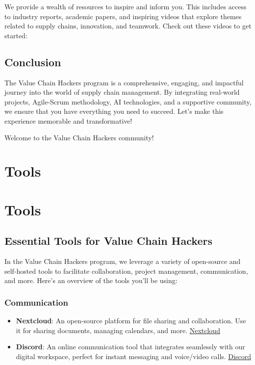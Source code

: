 \documentclass[
  letterpaper,
  DIV=11,
  numbers=noendperiod]{scrreprt}
\begin{document}
We provide a wealth of resources to inspire and inform you. This
includes access to industry reports, academic papers, and inspiring
videos that explore themes related to supply chains, innovation, and
teamwork. Check out these videos to get started:

\section{Conclusion}\label{conclusion-2}

The Value Chain Hackers program is a comprehensive, engaging, and
impactful journey into the world of supply chain management. By
integrating real-world projects, Agile-Scrum methodology, AI
technologies, and a supportive community, we ensure that you have
everything you need to succeed. Let's make this experience memorable and
transformative!

Welcome to the Value Chain Hackers community! 🚀🌟


\chapter{Tools}\label{tools}


\chapter{Tools}\label{tools-1}

\section{Essential Tools for Value Chain
Hackers}\label{essential-tools-for-value-chain-hackers}

In the Value Chain Hackers program, we leverage a variety of open-source
and self-hosted tools to facilitate collaboration, project management,
communication, and more. Here's an overview of the tools you'll be
using:

\subsection{Communication 📢}\label{communication}

\begin{itemize}
\item
  \textbf{Nextcloud}: An open-source platform for file sharing and
  collaboration. Use it for sharing documents, managing calendars, and
  more. \href{https://nextcloud.com/}{Nextcloud}
\item
  \textbf{Discord}: An online communication tool that integrates
  seamlessly with our digital workspace, perfect for instant messaging
  and voice/video calls. \href{https://discord.com/}{Discord}
\end{itemize}
\end{document}
